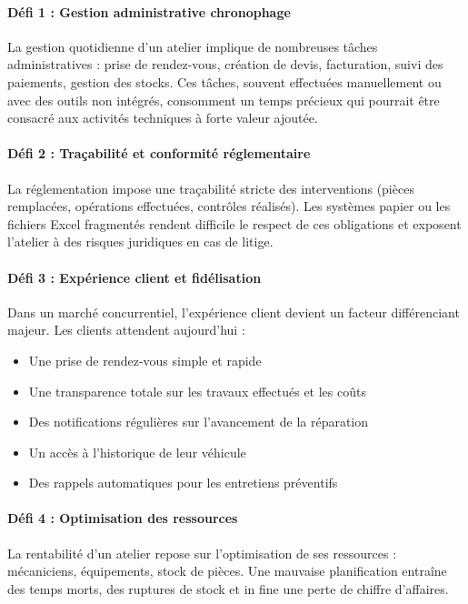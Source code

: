 \paragraph{Défi 1 : Gestion administrative chronophage}

La gestion quotidienne d'un atelier implique de nombreuses tâches administratives : prise de rendez-vous, création de devis, facturation, suivi des paiements, gestion des stocks. Ces tâches, souvent effectuées manuellement ou avec des outils non intégrés, consomment un temps précieux qui pourrait être consacré aux activités techniques à forte valeur ajoutée.

\paragraph{Défi 2 : Traçabilité et conformité réglementaire}

La réglementation impose une traçabilité stricte des interventions (pièces remplacées, opérations effectuées, contrôles réalisés). Les systèmes papier ou les fichiers Excel fragmentés rendent difficile le respect de ces obligations et exposent l'atelier à des risques juridiques en cas de litige.

\paragraph{Défi 3 : Expérience client et fidélisation}

Dans un marché concurrentiel, l'expérience client devient un facteur différenciant majeur. Les clients attendent aujourd'hui :
\begin{itemize}
    \item Une prise de rendez-vous simple et rapide
    \item Une transparence totale sur les travaux effectués et les coûts
    \item Des notifications régulières sur l'avancement de la réparation
    \item Un accès à l'historique de leur véhicule
    \item Des rappels automatiques pour les entretiens préventifs
\end{itemize}

\paragraph{Défi 4 : Optimisation des ressources}

La rentabilité d'un atelier repose sur l'optimisation de ses ressources : mécaniciens, équipements, stock de pièces. Une mauvaise planification entraîne des temps morts, des ruptures de stock et in fine une perte de chiffre d'affaires.

